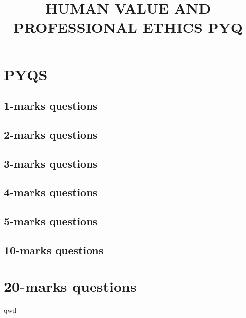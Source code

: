 \documentclass[12pt]{article}
\begin{document}
	\title{\LARGE{HUMAN VALUE AND PROFESSIONAL ETHICS PYQ}}
	\maketitle
	
	
	\newpage
	
	\section{\LARGE{PYQS}}
	
	\begin{enumerate}
		\subsection{1-marks questions}
		
		
		
		
		
		
		\subsection{2-marks questions}
		
		
		\subsection{3-marks questions}
		
		
		\subsection{4-marks questions}

		
		
		
		
		\subsection{5-marks questions}
		
		
		
		\subsection{10-marks questions}
		
		
		\section{20-marks questions}
		qwd
		
	\end{enumerate}
\end{document}
